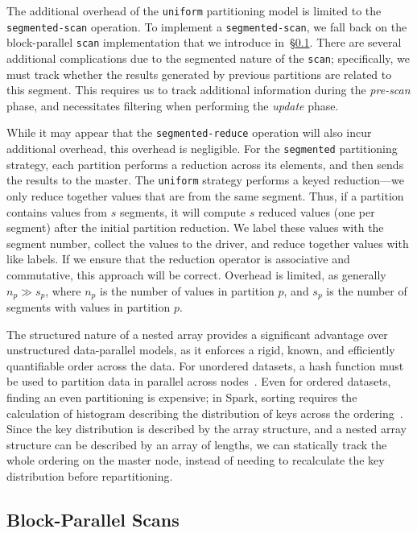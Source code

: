 \documentclass[preprint]{sigplanconf}
\theoremstyle{definition}
\begin{document}
The additional overhead of the \texttt{uniform} partitioning model is limited to the
\texttt{segmented-scan} operation. To implement a \linebreak\texttt{segmented-scan}, we fall back on
the block-parallel \texttt{scan} implementation that we introduce in~\S\ref{sec:block-parallel-scans}.
There are several additional complications due to the segmented nature of the \texttt{scan}; specifically,
we must track whether the results generated by previous partitions are related to this segment. This
requires us to track additional information during the \emph{pre-scan} phase, and necessitates filtering
when performing the \emph{update} phase.

While it may appear that the \texttt{segmented-reduce} operation will also incur additional overhead, this
overhead is negligible. For the \texttt{segmented} partitioning strategy, each partition performs a
reduction across its elements, and then sends the results to the master. The \texttt{uniform} strategy
performs a keyed reduction---we only reduce together values that are from the same segment. Thus, if a
partition contains values from $s$ segments, it will compute $s$ reduced values (one per segment) after
the initial partition reduction. We label these values with the segment number, collect the values to
the driver, and reduce together values with like labels. If we ensure that the reduction operator is
associative and commutative, this approach will be correct. Overhead is limited, as generally $n_p \gg
s_p$, where $n_p$ is the number of values in partition $p$, and $s_p$ is the number of segments with
values in partition $p$.

The structured nature of a nested array provides a significant advantage over unstructured data-parallel
models, as it enforces a rigid, known, and efficiently quantifiable order across the data. For unordered
datasets, a hash function must be used to partition data in parallel across nodes~\cite{dewitt90,
dean04}. Even for ordered datasets, finding an even partitioning is expensive; in Spark, sorting
requires the calculation of histogram describing the distribution of keys across the ordering~\cite{spark}.
Since the key distribution is described by the array structure, and a nested array structure can be
described by an array of lengths, we can statically track the whole ordering on the master node, instead
of needing to recalculate the key distribution before repartitioning.

\subsection{Block-Parallel Scans}
\label{sec:block-parallel-scans}
\end{document}

